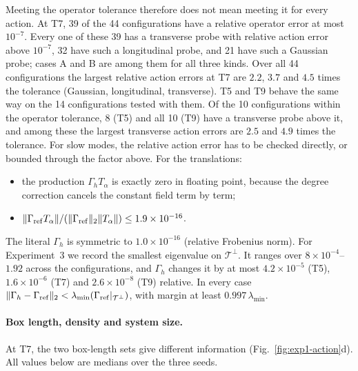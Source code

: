 Meeting the operator tolerance therefore does not mean meeting it for every action. At T7, 39 of the 44 configurations
have a relative operator error at most $10^{-7}$. Every one of these 39 has a transverse probe with relative action error
above $10^{-7}$, 32 have such a longitudinal probe, and 21 have such a Gaussian probe; cases A and B are among them for
all three kinds. Over all 44 configurations the largest relative action errors at T7 are $2.2$, $3.7$ and $4.5$ times
the tolerance (Gaussian, longitudinal, transverse). T5 and T9 behave the same way on the 14 configurations tested with them.
Of the 10 configurations within the operator tolerance, 8 (T5) and all 10 (T9) have a transverse probe above it, and
among these the largest transverse action errors are $2.5$ and $4.9$ times the tolerance. For slow modes, the relative
action error has to be checked directly, or bounded through the factor above.
For the translations:
\begin{itemize}
\item the production $\Gamma_hT_\alpha$ is exactly zero in floating point, because the degree correction cancels the constant field term by
  term;
\item $\|\Gamma_{\rm ref}T_\alpha\|/(\|\Gamma_{\rm ref}\|_2\|T_\alpha\|)\le1.9\times10^{-16}$.
\end{itemize}
The literal $\Gamma_h$ is symmetric to $1.0\times10^{-16}$ (relative Frobenius norm). For Experiment~3 we record the smallest
eigenvalue on $\mathcal T^\perp$. It ranges over $8\times10^{-4}$--$1.92$ across the configurations, and $\Gamma_h$
changes it by at most $4.2\times10^{-5}$ (T5), $1.6\times10^{-6}$ (T7) and $2.6\times10^{-8}$ (T9) relative. In every case
$\|\Gamma_h-\Gamma_{\rm ref}\|_2<\lambda_{\min}(\Gamma_{\rm ref}|_{\mathcal T^\perp})$, with margin at least
$0.997\,\lambda_{\min}$.

\paragraph{Box length, density and system size.}
At T7, the two box-length sets give different information (Fig.~\ref{fig:exp1-action}d). All values below are medians
over the three seeds.

